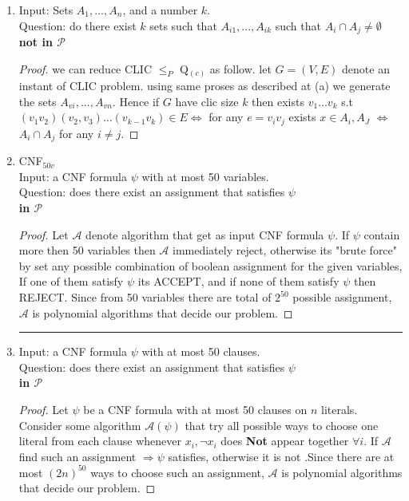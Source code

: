 \documentclass[12pt]{article}
\begin{document}
\begin{enumerate}[label=(\alph*)]
\begin{proof}
\end{proof}
Hence using same reduction described in (a) its holds that $3-$IND$\le_P3-$MDS.\\
\hrule
\item Input:  Sets $A_1, ..., A_n$, and a number $k$.\\ Question: do there exist $k$  sets such that $A_{i1} 
, ..., A_{ik}$ such that $A_i\cap A_j\neq \emptyset $\\
\textbf{ not in  $\mathcal{P}$}\begin{proof}
we can reduce CLIC $ \le_P$ Q$_{(c)}$ as follow. let $G=(V,E)$  denote an instant of CLIC problem. using same proses as described at (a) we generate the sets  $A_{vi}, ..., A_{vn}$. Hence if $G$ have clic size $k$ then exists $v_1\dots  v_k$ s.t $(v_1 v_2)(v_2,v_3)  \dots (v_{k-1} v_k)\in E \Leftrightarrow$ for any $e=v_iv_j$ exists $x\in A_i,A_J$  $\Leftrightarrow$   $A_i\cap A_j$ for any $i\ne j$.
\end{proof}
\item  CNF$_{50v}$\\
Input: a CNF formula $\psi$ with at most 50 variables.
\\Question: does there exist an assignment that satisfies  $\psi$ 
\\\textbf{ in  $\mathcal{P}$}
 \begin{proof}  Let  $\mathcal{A}$ denote algorithm  that get as input  CNF formula $\psi$. If $\psi$ contain more then 50 variables then $\mathcal{A}$ immediately reject, otherwise its "brute force" by set  any possible combination of boolean assignment for the given variables, If one of them satisfy $\psi$ its ACCEPT, and if none of them satisfy  $\psi$  then REJECT. Since from 50 variables  there are  total of  $2^{50}$ possible assignment, $\mathcal{A}$  is polynomial   algorithms that decide our problem.\end{proof}
\hrule 
\item Input: a CNF formula $\psi$ with at most 50 clauses.
\\Question: does there exist an assignment that satisfies  $\psi$ 
\\ \textbf{ in  $\mathcal{P}$}
\begin{proof}
Let $\psi$ be  a CNF formula with at most 50 clauses on $n$ literals. Consider some algorithm $\mathcal{A}(\psi)$ that  try all possible ways to choose one  literal from each clause whenever  $x_i,\neg x_i $ does \textbf{Not} appear together $\forall i$. If $\mathcal{A}$ find such an assignment $\Rightarrow\psi$ satisfies, otherwise it is not .Since there are at most $(2n)^{50}$ ways to choose such an assignment, $\mathcal{A}$ is polynomial   algorithms that decide our problem.

\end{proof}
\end{enumerate}
\end{document}
